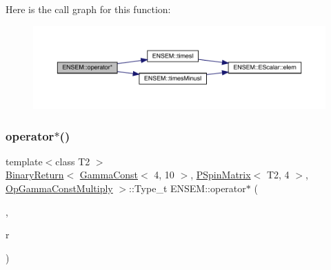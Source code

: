 Here is the call graph for this function\+:\nopagebreak
\begin{figure}[H]
\begin{center}
\leavevmode
\includegraphics[width=350pt]{d6/df5/group__primspinmatrix_gaa9f2a3db77b04450fdbceeca87443364_cgraph}
\end{center}
\end{figure}
\mbox{\label{group__primspinmatrix_ga6ad402d90ca05be34ec137e28d99fded}} 
\subsubsection{\texorpdfstring{operator$\ast$()}{operator*()}\hspace{0.1cm}{\footnotesize\ttfamily [11/64]}}
{\footnotesize\ttfamily template$<$class T2 $>$ \\
\mbox{\hyperlink{structENSEM_1_1BinaryReturn}{Binary\+Return}}$<$ \mbox{\hyperlink{classENSEM_1_1GammaConst}{Gamma\+Const}}$<$ 4, 10 $>$, \mbox{\hyperlink{classENSEM_1_1PSpinMatrix}{P\+Spin\+Matrix}}$<$ T2, 4 $>$, \mbox{\hyperlink{structENSEM_1_1OpGammaConstMultiply}{Op\+Gamma\+Const\+Multiply}} $>$\+::Type\+\_\+t E\+N\+S\+E\+M\+::operator$\ast$ (\begin{DoxyParamCaption}\item[{const \mbox{\hyperlink{classENSEM_1_1GammaConst}{Gamma\+Const}}$<$ 4, 10 $>$ \&}]{,  }\item[{const \mbox{\hyperlink{classENSEM_1_1PSpinMatrix}{P\+Spin\+Matrix}}$<$ T2, 4 $>$ \&}]{r }\end{DoxyParamCaption})\hspace{0.3cm}{\ttfamily [inline]}}

\mbox{\label{group__primspinmatrix_gaa5f831eba31e036c6d9d828c992751ae}} 
